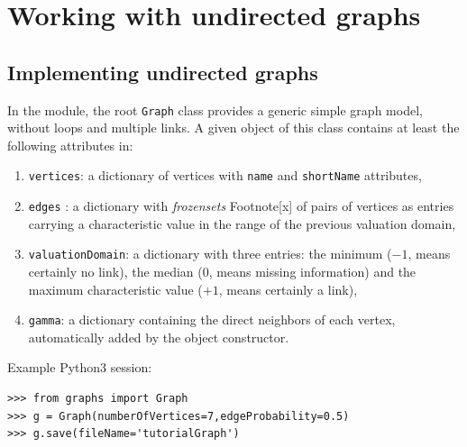 \chapter{Working with undirected graphs}
\label{sec:22}

\abstract*{}

\abstract{}

\section{Implementing undirected graphs}
\label{sec:22.1}

In the  module, the root \texttt{Graph} class provides a generic simple graph model, without loops and multiple links. A given object of this class contains at least the following attributes in:
\begin{enumerate}
\item \texttt{vertices}: a dictionary of vertices with \texttt{name} and \texttt{shortName} attributes,
\item \texttt{edges} : a dictionary with \emph{frozensets} Footnote[x] of pairs of vertices as entries carrying a characteristic value in the range of the previous valuation domain,
\item \texttt{valuationDomain}: a dictionary with three entries: the minimum ($-1$, means certainly no link), the median ($0$, means missing information) and the maximum characteristic value ($+1$, means certainly a link),
\item \texttt{gamma}: a dictionary containing the direct neighbors of each vertex, automatically added by the object constructor.
\end{enumerate}

Example Python3 session:
\begin{lstlisting}
>>> from graphs import Graph
>>> g = Graph(numberOfVertices=7,edgeProbability=0.5)
>>> g.save(fileName='tutorialGraph')
\end{lstlisting}

